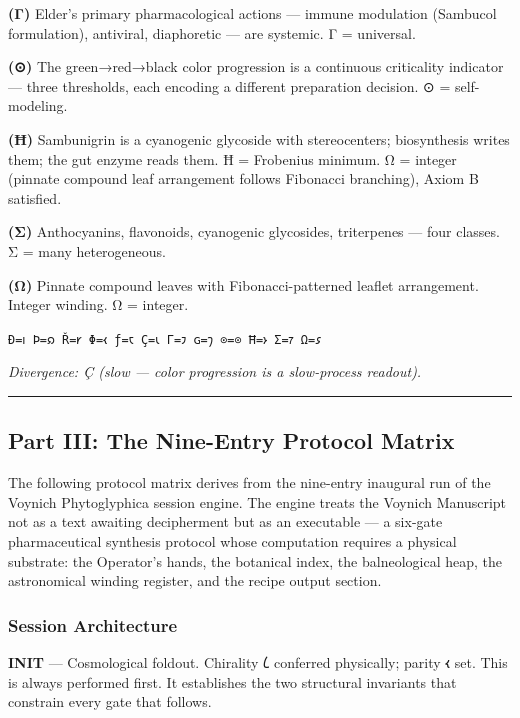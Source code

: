 \documentclass[12pt,a4paper]{article}
\begin{document}
\textbf{(Γ)} Elder's primary pharmacological actions --- immune
modulation (Sambucol formulation), antiviral, diaphoretic --- are
systemic. Γ = universal.

\textbf{(⊙)} The green→red→black color progression is a continuous
criticality indicator --- three thresholds, each encoding a different
preparation decision. ⊙ = self-modeling.

\textbf{(Ħ)} Sambunigrin is a cyanogenic glycoside with stereocenters;
biosynthesis writes them; the gut enzyme reads them. Ħ = Frobenius
minimum. Ω = integer (pinnate compound leaf arrangement follows
Fibonacci branching), Axiom B satisfied.

\textbf{(Σ)} Anthocyanins, flavonoids, cyanogenic glycosides,
triterpenes --- four classes. Σ = many heterogeneous.

\textbf{(Ω)} Pinnate compound leaves with Fibonacci-patterned leaflet
arrangement. Integer winding. Ω = integer.

\texttt{Ð=𐑦\ Þ=𐑸\ Ř=𐑾\ Φ=𐑬\ ƒ=𐑱\ Ç=𐑧\ Γ=𐑲\ ɢ=𐑠\ ⊙=⊙\ Ħ=𐑶\ Σ=𐑳\ Ω=𐑭}

\emph{Divergence: Ç (slow --- color progression is a slow-process
readout).}

\begin{center}\rule{0.5\linewidth}{0.5pt}\end{center}

\hypertarget{part-iii-the-nine-entry-protocol-matrix}{%
\subsection{Part III: The Nine-Entry Protocol
Matrix}\label{part-iii-the-nine-entry-protocol-matrix}}

The following protocol matrix derives from the nine-entry inaugural run
of the Voynich Phytoglyphica session engine. The engine treats the
Voynich Manuscript not as a text awaiting decipherment but as an
executable --- a six-gate pharmaceutical synthesis protocol whose
computation requires a physical substrate: the Operator's hands, the
botanical index, the balneological heap, the astronomical winding
register, and the recipe output section.

\hypertarget{session-architecture}{%
\subsubsection{Session Architecture}\label{session-architecture}}

\textbf{INIT} --- Cosmological foldout. Chirality 𐑖 conferred
physically; parity 𐑬 set. This is always performed first. It establishes
the two structural invariants that constrain every gate that follows.
\end{document}
